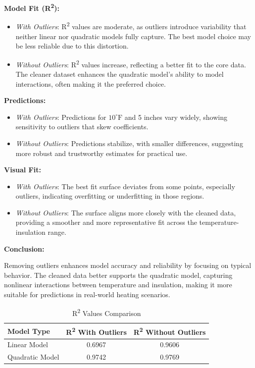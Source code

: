 \documentclass[12pt]{article}
\begin{document}
\checkmark \textbf{Model Fit (R\textsuperscript{2}):}
\begin{itemize}
    \item \textit{With Outliers}: R\textsuperscript{2} values are moderate, as outliers introduce variability that neither linear nor quadratic models fully capture. The best model choice may be less reliable due to this distortion.
    \item \textit{Without Outliers}: R\textsuperscript{2} values increase, reflecting a better fit to the core data. The cleaner dataset enhances the quadratic model's ability to model interactions, often making it the preferred choice.
\end{itemize}

\checkmark \textbf{Predictions:}
\begin{itemize}
    \item \textit{With Outliers}: Predictions for \(10^\circ\text{F}\) and 5 inches vary widely, showing sensitivity to outliers that skew coefficients.
    \item \textit{Without Outliers}: Predictions stabilize, with smaller differences, suggesting more robust and trustworthy estimates for practical use.
\end{itemize}

\checkmark \textbf{Visual Fit:}
\begin{itemize}
    \item \textit{With Outliers}: The best fit surface deviates from some points, especially outliers, indicating overfitting or underfitting in those regions.
    \item \textit{Without Outliers}: The surface aligns more closely with the cleaned data, providing a smoother and more representative fit across the temperature-insulation range.
\end{itemize}
\begin{adjustwidth}{0cm}{0cm}
\checkmark \textbf{Conclusion:}
\end{adjustwidth}
Removing outliers enhances model accuracy and reliability by focusing on typical behavior. The cleaned data better supports the quadratic model, capturing nonlinear interactions between temperature and insulation, making it more suitable for predictions in real-world heating scenarios.

\begin{table}[h!]
    \centering
    \caption{R\textsuperscript{2} Values Comparison}
    \begin{tabular}{lcc}
        \toprule
        \textbf{Model Type} & \textbf{R\textsuperscript{2} With Outliers} & \textbf{R\textsuperscript{2} Without Outliers} \\
        \midrule
        Linear Model & 0.6967 & 0.9606 \\
        Quadratic Model & 0.9742 & 0.9769 \\
        \bottomrule
    \end{tabular}
\end{table}
\end{document}

